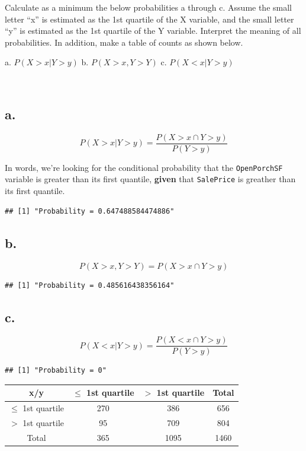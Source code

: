 \documentclass[]{article}
\begin{document}
Calculate as a minimum the below probabilities a through c. Assume the
small letter ``x'' is estimated as the 1st quartile of the X variable,
and the small letter ``y'' is estimated as the 1st quartile of the Y
variable. Interpret the meaning of all probabilities. In addition, make
a table of counts as shown below.

\begin{center}
a. $P(X > x | Y > y)$  \hspace{20pt} b. $P(X > x, Y > Y)$ \hspace{20pt} c. $P(X < x | Y > y)$
\end{center}

~ ~

\hypertarget{a.}{%
\subsection{a.}\label{a.}}

\[
P(X > x | Y > y) = \frac{P(X > x \cap Y > y)}{P(Y > y)}
\]

In words, we're looking for the conditional probability that the
\texttt{OpenPorchSF} variable is greater than its first quantile,
\textbf{given} that \texttt{SalePrice} is greather than its first
quantile.

\begin{verbatim}
## [1] "Probability = 0.647488584474886"
\end{verbatim}

\hypertarget{b.}{%
\subsection{b.}\label{b.}}

\[
P(X > x, Y > Y) = P(X > x \cap Y > y)
\]

\begin{verbatim}
## [1] "Probability = 0.485616438356164"
\end{verbatim}

\hypertarget{c.}{%
\subsection{c.}\label{c.}}

\[
P(X < x | Y > y) = \frac{P(X < x \cap Y > y)}{P(Y > y)}
\]

\begin{verbatim}
## [1] "Probability = 0"
\end{verbatim}

\begin{center}
\begin{tabular}{|c|c|c|c|}
\hline
x/y & $\leq$ 1st quartile & $>$ 1st quartile & Total \\ \hline
$\leq$ 1st quartile & 270 & 386 & 656 \\ \hline
$>$ 1st quartile & 95  &  709 & 804 \\ \hline
Total & 365 & 1095 & 1460 \\ \hline
\end{tabular}
\end{center}
\end{document}
